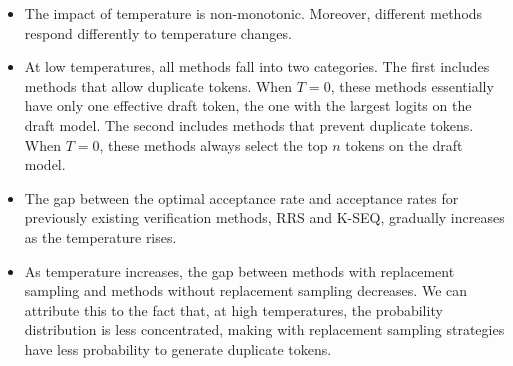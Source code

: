 \documentclass{article}
\begin{document}
\begin{itemize}[leftmargin=*,noitemsep=0mm,topsep=-2pt]
    \item 
The impact of temperature is non-monotonic. Moreover, different methods respond differently to temperature changes.
\item
    At low temperatures, all methods fall into two categories. The first includes methods that allow duplicate tokens. When $T=0$, these methods essentially have only one effective draft token, the one with the largest logits on the draft model. The second includes methods that prevent duplicate tokens. When $T=0$, these methods always select the top $n$ tokens on the draft model.
    \item 
The gap between the optimal acceptance rate and acceptance rates for previously existing verification methods, RRS and K-SEQ, gradually increases as the temperature rises.
\item 
As temperature increases, the gap between methods with replacement sampling and methods without replacement sampling decreases.
We can attribute this to the fact that,
    at high temperatures, the probability distribution is less concentrated, making with replacement sampling strategies have less probability to generate duplicate tokens. 
\end{itemize}
\end{document}
